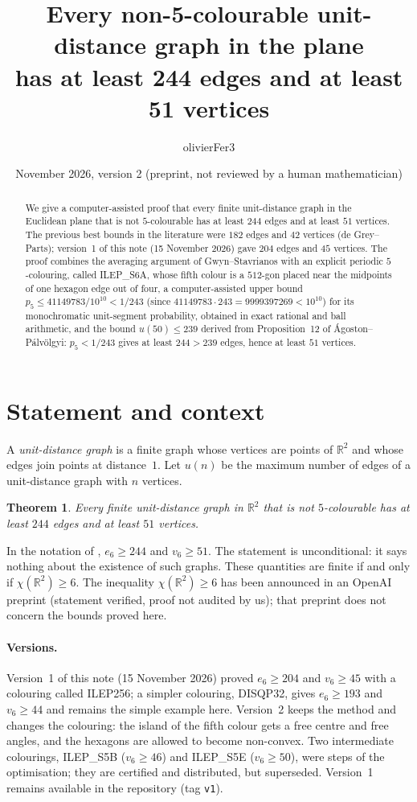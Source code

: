 \documentclass[10pt,a4paper]{article}
\title{Every non-5-colourable unit-distance graph in the plane\\ has at least 244 edges and at least 51 vertices}
\author{olivierFer3}
\date{November 2026, version 2 \quad (preprint, not reviewed by a human mathematician)}
\newtheorem{theorem}{Theorem}
\newcommand{\R}{\mathbb{R}}
\begin{document}
\maketitle

\begin{abstract}
We give a computer-assisted proof that every finite unit-distance graph in the Euclidean plane that
is not $5$-colourable has at least $244$ edges and at least $51$ vertices. The previous best bounds in the
literature were $182$ edges and $42$ vertices (de Grey--Parts); version~1 of this note (15 November 2026)
gave $204$ edges and $45$ vertices. The proof combines the averaging argument of Gwyn--Stavrianos with an
explicit periodic $5$-colouring, called ILEP\_S6A, whose fifth colour is a $512$-gon placed near the
midpoints of one hexagon edge out of four, a computer-assisted upper bound
$p_5\le 41149783/10^{10}<1/243$ (since $41149783\cdot243=9999397269<10^{10}$) for its monochromatic
unit-segment probability, obtained in exact rational and ball arithmetic, and the bound $u(50)\le239$ derived
from Proposition~12 of \'Agoston--P\'alv\"olgyi: $p_5<1/243$ gives at least $244>239$ edges, hence at least
$51$ vertices.
\end{abstract}

\section{Statement and context}

A \emph{unit-distance graph} is a finite graph whose vertices are points of $\R^2$ and whose edges join
points at distance~$1$. Let $u(n)$ be the maximum number of edges of a unit-distance graph with $n$
vertices.

\begin{theorem}\label{thm:main}
Every finite unit-distance graph in $\R^2$ that is not $5$-colourable has at least $244$ edges and
at least $51$ vertices.
\end{theorem}

In the notation of \cite{dGP}, $e_6\ge244$ and $v_6\ge51$. The statement is unconditional: it says
nothing about the existence of such graphs. These quantities are finite if and only if
$\chi(\R^2)\ge6$. The inequality $\chi(\R^2)\ge6$ has been announced in an OpenAI preprint \cite{OAI}
(statement verified, proof not audited by us); that preprint does not concern the bounds proved here.

\paragraph{Versions.} Version~1 of this note (15 November 2026) proved $e_6\ge204$ and $v_6\ge45$ with a
colouring called ILEP256; a simpler colouring, DISQP32, gives $e_6\ge193$ and $v_6\ge44$ and remains the
simple example here. Version~2 keeps the method and changes the colouring: the island of the fifth colour
gets a free centre and free angles, and the hexagons are allowed to become non-convex. Two intermediate
colourings, ILEP\_S5B ($v_6\ge46$) and ILEP\_S5E ($v_6\ge50$), were steps of the optimisation; they are
certified and distributed, but superseded. Version~1 remains available in the repository (tag \texttt{v1}).
\end{document}
